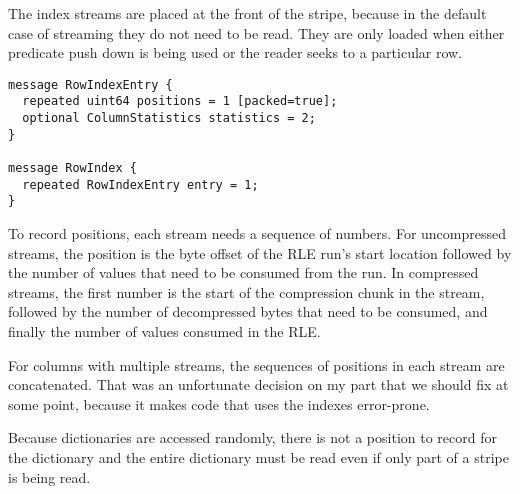 \documentclass{article}
\begin{document}
The index streams are placed at the front of the stripe, because in
the default case of streaming they do not need to be read. They are
only loaded when either predicate push down is being used or the
reader seeks to a particular row.

\begin{verbatim}
message RowIndexEntry {
  repeated uint64 positions = 1 [packed=true];
  optional ColumnStatistics statistics = 2;
}

message RowIndex {
  repeated RowIndexEntry entry = 1;
}
\end{verbatim}

To record positions, each stream needs a sequence of numbers. For
uncompressed streams, the position is the byte offset of the RLE run's
start location followed by the number of values that need to be
consumed from the run. In compressed streams, the first number is the
start of the compression chunk in the stream, followed by the number
of decompressed bytes that need to be consumed, and finally the number
of values consumed in the RLE.

For columns with multiple streams, the sequences of positions in each
stream are concatenated. That was an unfortunate decision on my part
that we should fix at some point, because it makes code that uses the
indexes error-prone.

Because dictionaries are accessed randomly, there is not a position to
record for the dictionary and the entire dictionary must be read even
if only part of a stripe is being read.
\end{document}
